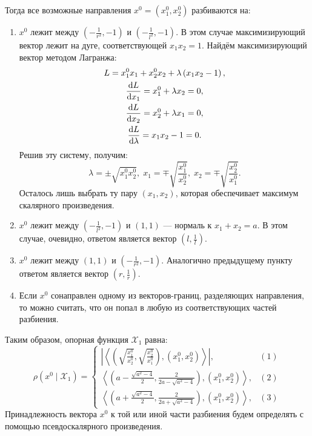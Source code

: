 \documentclass[11pt]{article}
\newcommand\abs[1]{\left\lvert#1\right\rvert}
\newcommand{\scalar}[2]{\left<#1,#2\right>}
\renewcommand{\d}[1]{\ensuremath{\operatorname{d}\!{#1}}}
\begin{document}
Тогда все возможные направления $x^0 = \left(x_1^0, x_2^0 \right)$ разбиваются на:
\begin{enumerate}
\item
$x^0$ лежит между $\left( -\tfrac{1}{r^2}, -1 \right)$ и $\left( -\tfrac{1}{l^2}, -1 \right)$.
В этом случае максимизирующий вектор лежит на дуге, соответствующей $x_1 x_2 = 1$. Найдём максимизирующий вектор методом Лагранжа:
\begin{gather}
L = x_1^0 x_1 + x_2^0 x_2 + \lambda \left( x_1 x_2 - 1 \right), \notag \\
\frac{\d{L}}{\d{x_1}} = x_1^0 + \lambda x_2 = 0, \notag \\
\frac{\d{L}}{\d{x_2}} = x_2^0 + \lambda x_1 = 0, \notag \\
\frac{\d{L}}{\d{\lambda}} = x_1 x_2 - 1 = 0. \notag
\end{gather}
Решив эту систему, получим:
$$
\lambda = \pm \sqrt{x_1^0 x_2^0}, \; x_1 = \mp \sqrt{\frac{x_1^0}{x_2^0}}, \; x_2 = \mp \sqrt{\frac{x_2^0}{x_1^0}}.
$$
Осталось лишь выбрать ту пару $\left( x_1, x_2 \right)$, которая обеспечивает максимум скалярного произведения.
\item
$x^0$ лежит между $\left( -\tfrac{1}{l^2}, -1 \right)$ и $\left( 1, 1 \right)$ --- нормаль к $x_1 + x_2 = a$. В этом случае, очевидно, ответом является вектор $\left( l, \tfrac{1}{l} \right)$.
\item
$x^0$ лежит между $\left( 1, 1 \right)$ и $\left( -\tfrac{1}{r^2}, -1 \right)$. Аналогично предыдущему пункту ответом является вектор $\left( r, \tfrac{1}{r} \right)$.
\item
Если $x^0$ сонаправлен одному из векторов-границ, разделяющих направления, то можно считать, что он попал в любую из соответствующих частей разбиения.
\end{enumerate}
Таким образом, опорная функция $\mathcal{X}_1$ равна:
$$
\rho \left(x^0 \mid \mathcal{X}_1 \right) =
\begin{cases}
\abs{\scalar{\left( \sqrt{\frac{x_1^0}{x_2^0}}, \sqrt{\frac{x_2^0}{x_1^0}} \right)}{\left( x_1^0, x_2^0 \right)}}, & (1) \\
\scalar{\left( a - \frac{\sqrt{a^2 - 4}}{2}, \frac{2}{2a - \sqrt{a^2 - 4}} \right)}{\left( x_1^0, x_2^0 \right)}, & (2) \\
\scalar{\left( a + \frac{\sqrt{a^2 - 4}}{2}, \frac{2}{2a + \sqrt{a^2 - 4}} \right)}{\left( x_1^0, x_2^0 \right)}, & (3)
\end{cases}
$$
Принадлежность вектора $x^0$ к той или иной части разбиения будем определять с помощью псевдоскалярного произведения.
\end{document}
